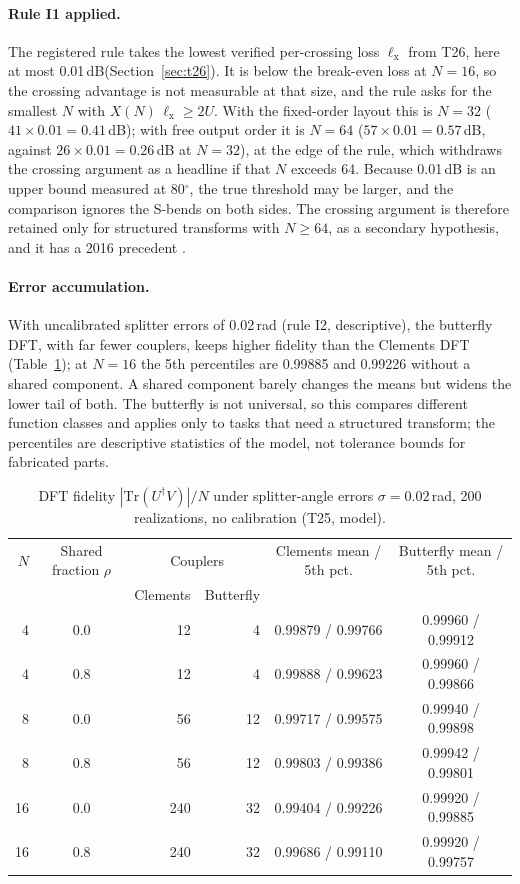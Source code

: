 \documentclass[11pt,a4paper]{article}
\newcommand{\dB}{\,dB\xspace}
\begin{document}
\paragraph{Rule I1 applied.} The registered rule takes the lowest verified per-crossing loss $\ell_\mathrm{x}$ from T26, here at most 0.01\dB (Section~\ref{sec:t26}). It is below the break-even loss at $N=16$, so the crossing advantage is not measurable at that size, and the rule asks for the smallest $N$ with $X(N)\,\ell_\mathrm{x}\ge2U$. With the fixed-order layout this is $N=32$ ($41\times0.01=0.41$\dB); with free output order it is $N=64$ ($57\times0.01=0.57$\dB, against $26\times0.01=0.26$\dB at $N=32$), at the edge of the rule, which withdraws the crossing argument as a headline if that $N$ exceeds 64. Because 0.01\dB is an upper bound measured at 80$^\circ$, the true threshold may be larger, and the comparison ignores the S-bends on both sides. The crossing argument is therefore retained only for structured transforms with $N\ge64$, as a secondary hypothesis, and it has a 2016 precedent \cite{Crespi2016}.

\paragraph{Error accumulation.} With uncalibrated splitter errors of 0.02\,rad (rule I2, descriptive), the butterfly DFT, with far fewer couplers, keeps higher fidelity than the Clements DFT (Table~\ref{tab:errors}); at $N=16$ the 5th percentiles are 0.99885 and 0.99226 without a shared component. A shared component barely changes the means but widens the lower tail of both. The butterfly is not universal, so this compares different function classes and applies only to tasks that need a structured transform; the percentiles are descriptive statistics of the model, not tolerance bounds for fabricated parts.

\begin{table}[t]
\centering\small
\caption{DFT fidelity $|\mathrm{Tr}(U^\dagger V)|/N$ under splitter-angle errors $\sigma=0.02$\,rad, 200 realizations, no calibration (T25, model).}
\label{tab:errors}
\begin{tabular}{@{}rcrrcc@{}}
\toprule
$N$ & Shared fraction $\rho$ & \multicolumn{2}{c}{Couplers} & Clements mean / 5th pct. & Butterfly mean / 5th pct. \\
 & & Clements & Butterfly & & \\
\midrule
4 & 0.0 & 12 & 4 & 0.99879 / 0.99766 & 0.99960 / 0.99912 \\
4 & 0.8 & 12 & 4 & 0.99888 / 0.99623 & 0.99960 / 0.99866 \\
8 & 0.0 & 56 & 12 & 0.99717 / 0.99575 & 0.99940 / 0.99898 \\
8 & 0.8 & 56 & 12 & 0.99803 / 0.99386 & 0.99942 / 0.99801 \\
16 & 0.0 & 240 & 32 & 0.99404 / 0.99226 & 0.99920 / 0.99885 \\
16 & 0.8 & 240 & 32 & 0.99686 / 0.99110 & 0.99920 / 0.99757 \\
\bottomrule
\end{tabular}
\end{table}
\end{document}
